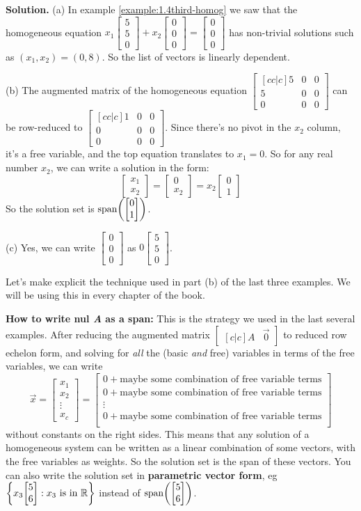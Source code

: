 \documentclass[11pt, letterpaper]{report}
\newenvironment{book}{}{}
\let\originalleft\left
\let\originalright\right
\renewcommand{\left}{\mathopen{}\mathclose\bgroup\originalleft}
\renewcommand{\right}{\aftergroup\egroup\originalright}
\newcounter{example}[section]
\newlength\oldfboxsep%
\newlength\myminiwidth%
\newenvironment{bbox}{%
  \setlength\oldfboxsep\fboxsep
  \setlength{\fboxsep}{.1in}%
  \setlength\myminiwidth\linewidth%
  \addtolength\myminiwidth{-0.2in}%
  \vspace{0.1in}%
  \begin{lrbox}{\bboxbox}\begin{minipage}{\myminiwidth}%
    }{%
    \end{minipage}\end{lrbox}%
  \noindent\fbox{\usebox{\bboxbox}}\vspace{0.1in}\setlength\fboxsep\oldfboxsep%
}
\newcommand{\R}{\mathbb{R}}
\DeclareMathOperator{\spn}{span}
\newcommand{\bbvec}[2]{
  \begin{bmatrix} #1 \\ #2 \end{bmatrix}
}
\newcommand{\bbbvec}[3]{
  \begin{bmatrix} #1 \\ #2 \\ #3 \end{bmatrix}
}
\begin{document}
\begin{book}
\textbf{Solution.} (a) In example \ref{example:1.4third-homog} we saw that the homogeneous equation $x_1 \bbbvec{5}{5}{0} + x_2 \bbbvec{0}{0}{0} = \bbbvec{0}{0}{0}$ has non-trivial solutions such as $(x_1,x_2) = (0,8)$. So the list of vectors is linearly dependent.

(b) The augmented matrix of the homogeneous equation $\begin{bmatrix}[cc|c]
5 & 0 & 0 \\
5 & 0 & 0 \\
0 & 0 & 0
\end{bmatrix}$ can be row-reduced to $\begin{bmatrix}[cc|c]
1 & 0 & 0 \\
0 & 0 & 0 \\
0 & 0 & 0
\end{bmatrix}$. Since there's no pivot in the $x_2$ column, it's a free variable, and the top equation translates to $x_1=0$. So for any real number $x_2$, we can write a solution in the form:
\[
\bbvec{x_1}{x_2} = \bbvec{0}{x_2} = x_2\bbvec{0}{1}
\]
So the solution set is $\spn \left( \bbvec{0}{1} \right)$. 

(c) Yes, we can write $\bbbvec{0}{0}{0}$ as $0 \bbbvec{5}{5}{0}$. \blacksquare
\end{book}

Let's make explicit the technique used in part (b) of the last three examples. We will be using this in every chapter of the book.

\begin{bbox}  
\textbf{How to write nul \emph{A} as a span:} This is the strategy we used in the last several examples. After reducing the augmented matrix $
\begin{bmatrix}[c|c]
A & \vec{0}
\end{bmatrix}
$ to reduced row echelon form, and solving for \emph{all} the (basic \emph{and} free) variables in terms of the free variables, we can write
\[ \vec{x} = \begin{bmatrix} 
x_1 \\ x_2 \\ \vdots \\ x_c
\end{bmatrix} =
\begin{bmatrix}
0 + \textrm{maybe some combination of free variable terms} \\
0 + \textrm{maybe some combination of free variable terms} \\
\vdots \\
0 + \textrm{maybe some combination of free variable terms} \\
\end{bmatrix}
\]
without constants on the right sides. This means that any solution of a homogeneous system can be written as a linear combination of some vectors, with the free variables as weights. So the solution set is the span of these vectors. You can also write the solution set in \textbf{parametric vector form}, eg $\left\{ x_3 \bbvec{5}{6} : x_3 \text{ is in } \R \right\}$ instead of $\spn \left( \bbvec{5}{6} \right)$.
\end{bbox}
\end{document}
